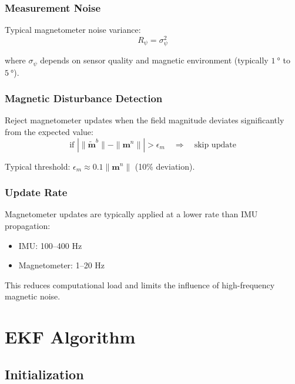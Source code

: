 \documentclass[11pt,a4paper]{article}
\newcommand{\mat}[1]{\mathbf{#1}}
\begin{document}
\subsubsection{Measurement Noise}

Typical magnetometer noise variance:
\begin{equation}
    R_{\psi} = \sigma_{\psi}^2
\end{equation}

where $\sigma_{\psi}$ depends on sensor quality and magnetic environment (typically $\SI{1}{\degree}$ to $\SI{5}{\degree}$).

\subsubsection{Magnetic Disturbance Detection}

Reject magnetometer updates when the field magnitude deviates significantly from the expected value:
\begin{equation}
    \text{if } \left| \|\tilde{\mat{m}}^b\| - \|\mat{m}^n\| \right| > \epsilon_m \quad \Rightarrow \quad \text{skip update}
\end{equation}

Typical threshold: $\epsilon_m \approx 0.1 \|\mat{m}^n\|$ (10\% deviation).

\subsubsection{Update Rate}

Magnetometer updates are typically applied at a lower rate than IMU propagation:
\begin{itemize}
    \item IMU: 100--400 Hz
    \item Magnetometer: 1--20 Hz
\end{itemize}

This reduces computational load and limits the influence of high-frequency magnetic noise.

\section{EKF Algorithm}

\subsection{Initialization}
\end{document}
